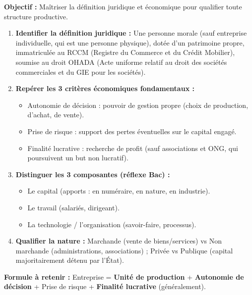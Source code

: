 \documentclass[11pt]{article}
\newcommand{\cle}[1]{{\popxbold\color{popdark}#1}}
\begin{document}
\begin{methode}
    \textbf{Objectif :} Maîtriser la définition juridique et économique pour qualifier toute structure productive.
    \begin{enumerate}
        \item \textbf{Identifier la définition juridique :} Une personne morale (sauf entreprise individuelle, qui est une personne physique), dotée d'un patrimoine propre, immatriculée au \cle{RCCM} (Registre du Commerce et du Crédit Mobilier), soumise au droit \cle{OHADA} (Acte uniforme relatif au droit des sociétés commerciales et du GIE pour les sociétés).
        \item \textbf{Repérer les 3 critères économiques fondamentaux :}
              \begin{itemize}
                  \item \cle{Autonomie de décision} : pouvoir de gestion propre (choix de production, d'achat, de vente).
                  \item \cle{Prise de risque} : support des pertes éventuelles sur le capital engagé.
                  \item \cle{Finalité lucrative} : recherche de profit (sauf associations et ONG, qui poursuivent un but non lucratif).
              \end{itemize}
        \item \textbf{Distinguer les 3 composantes (réflexe Bac) :}
              \begin{itemize}
                  \item \cle{Le capital} (apports : en numéraire, en nature, en industrie).
                  \item \cle{Le travail} (salariés, dirigeant).
                  \item \cle{La technologie / l'organisation} (savoir-faire, processus).
              \end{itemize}
        \item \textbf{Qualifier la nature :} Marchande (vente de biens/services) vs Non marchande (administrations, associations) ; Privée vs Publique (capital majoritairement détenu par l'État).
    \end{enumerate}
    \textbf{Formule à retenir :} Entreprise = \textbf{Unité de production} + \textbf{Autonomie de décision} + \cle{Prise de risque} + \textbf{Finalité lucrative} (généralement).
\end{methode}
\end{document}
